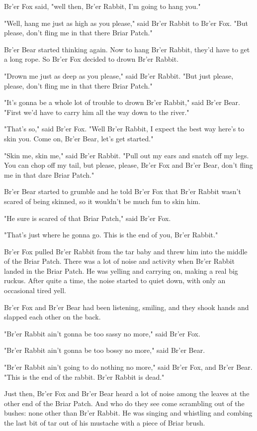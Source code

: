 Br'er Fox said, "well then, Br'er Rabbit, I'm going to hang you."

"Well, hang me just as high as you please," said Br'er Rabbit to Br'er Fox. "But please, don't fling me in that there Briar Patch."

Br'er Bear started thinking again. Now to hang Br'er Rabbit, they'd have to get a long rope. So Br'er Fox decided to drown Br'er Rabbit.

"Drown me just as deep as you please," said Br'er Rabbit. "But just please, please, don't fling me in that there Briar Patch."

"It's gonna be a whole lot of trouble to drown Br'er Rabbit," said Br'er Bear. "First we'd have to carry him all the way down to the river."

"That's so," said Br'er Fox. "Well Br'er Rabbit, I expect the best way here's to skin you. Come on, Br'er Bear, let's get started."

"Skin me, skin me," said Br'er Rabbit. "Pull out my ears and snatch off my legs. You can chop off my tail, but please, please, Br'er Fox and Br'er Bear, don't fling me in that dare Briar Patch."

Br'er Bear started to grumble and he told Br'er Fox that Br'er Rabbit wasn't scared of being skinned, so it wouldn't be much fun to skin him.

"He sure is scared of that Briar Patch," said Br'er Fox.

"That's just where he gonna go. This is the end of you, Br'er Rabbit."

Br'er Fox pulled Br'er Rabbit from the tar baby and threw him into the middle of the Briar Patch. There was a lot of noise and activity when Br'er Rabbit landed in the Briar Patch. He was yelling and carrying on, making a real big ruckus. After quite a time, the noise started to quiet down, with only an occasional tired yell.

Br'er Fox and Br'er Bear had been listening, smiling, and they shook hands and slapped each other on the back.

"Br'er Rabbit ain't gonna be too sassy no more," said Br'er Fox.

"Br'er Rabbit ain't gonna be too bossy no more," said Br'er Bear.

"Br'er Rabbit ain't going to do nothing no more," said Br'er Fox, and Br'er Bear. "This is the end of the rabbit. Br'er Rabbit is dead."

Just then, Br'er Fox and Br'er Bear heard a lot of noise among the leaves at the other end of the Briar Patch. And who do they see come scrambling out of the bushes: none other than Br'er Rabbit. He was singing and whistling and combing the last bit of tar out of his mustache with a piece of Briar brush.

